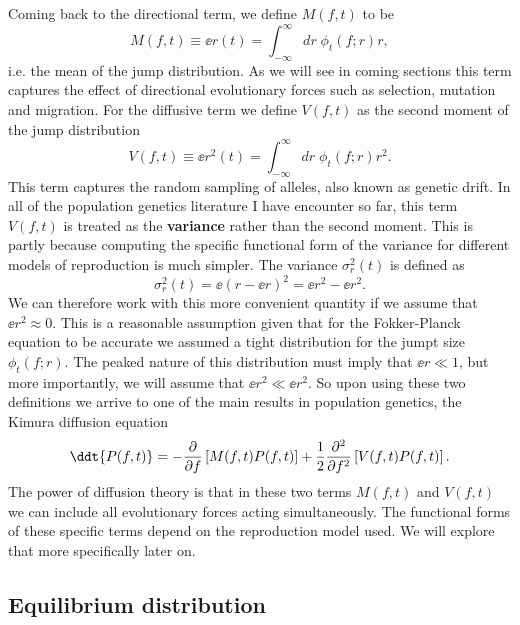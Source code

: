 Coming back to the directional term, we define $M(f, t)$ to be
\begin{equation}
  M(f, t) \equiv \ee{r(t)} = \int_{-\infty}^{\infty} dr \; \phi_t(f; r) r,
\end{equation}
i.e. the mean of the jump distribution. As we will see in coming sections this
term captures the effect of directional evolutionary forces such as selection,
mutation and migration. For the diffusive term we define $V(f, t)$ as the second
moment of the jump distribution
\begin{equation}
  V(f, t) \equiv \ee{r^2(t)} = \int_{-\infty}^{\infty} dr \; \phi_t(f; r) r^2.
\end{equation}
This term captures the random sampling of alleles, also known as genetic drift.
In all of the population genetics literature I have encounter so far, this term
$V(f, t)$ is treated as the \textbf{variance} rather than the second moment.
This is partly because computing the specific functional form of the variance
for different models of reproduction is much simpler. The variance
$\sigma_r^2(t)$ is defined as
\begin{equation}
  \sigma_r^2(t) = \ee{\left( r - \ee{r} \right)^2} = \ee{r^2} - \ee{r}^2.
\end{equation}
We can therefore work with this more convenient quantity if we assume that
$\ee{r}^2 \approx 0$. This is a reasonable assumption given that for the
Fokker-Planck equation to be accurate we assumed a tight distribution for the
jumpt size $\phi_t(f; r)$. The peaked nature of this distribution must imply
that $\ee{r} \ll 1$, but more importantly, we will assume that
$\ee{r}^2 \ll \ee{r^2}$. So upon using these two definitions we arrive to one
of the main results in population genetics, the Kimura diffusion equation
\begin{equation}
  \ddt{P(f, t)} = - {\partial \over \partial f}
  \left[
  M(f, t) P(f, t)
  \right] +
  {1 \over 2}{\partial^2 \over \partial f^2}
  \left[
  V(f, t) P(f, t)
  \right].
  \label{eq_kimura_diffusion}
\end{equation}
The power of diffusion theory is that in these two terms $M(f, t)$ and $V(f, t)$
we can include all evolutionary forces acting simultaneously. The functional
forms of these specific terms depend on the reproduction model used. We will
explore that more specifically later on.

\subsection{Equilibrium distribution}

